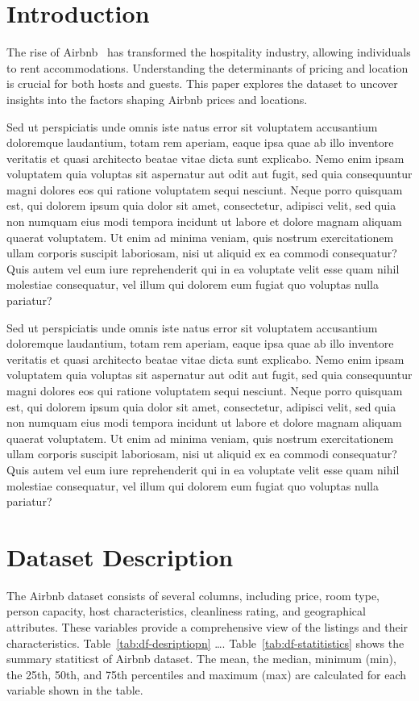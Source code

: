 \documentclass[10pt, conference, compsocconf]{IEEEtran}
\begin{document}
\section{Introduction}
The rise of Airbnb~\cite{andreu2020airbnb} has transformed the hospitality industry, allowing individuals to rent accommodations. 
Understanding the determinants of pricing and location is crucial for both hosts and guests. 
This paper explores the dataset to uncover insights into the factors shaping Airbnb prices and locations.

Sed ut perspiciatis unde omnis iste natus error sit voluptatem accusantium doloremque laudantium, totam rem aperiam, eaque ipsa quae ab illo inventore veritatis et quasi architecto beatae vitae dicta sunt explicabo. 
Nemo enim ipsam voluptatem quia voluptas sit aspernatur aut odit aut fugit, sed quia consequuntur magni dolores eos qui ratione voluptatem sequi nesciunt. Neque porro quisquam est, qui dolorem ipsum quia dolor sit amet, consectetur, adipisci velit, sed quia non numquam eius modi tempora incidunt ut labore et dolore magnam aliquam quaerat voluptatem. 
Ut enim ad minima veniam, quis nostrum exercitationem ullam corporis suscipit laboriosam, nisi ut aliquid ex ea commodi consequatur? Quis autem vel eum iure reprehenderit qui in ea voluptate velit esse quam nihil molestiae consequatur, vel illum qui dolorem eum fugiat quo voluptas nulla pariatur?

Sed ut perspiciatis unde omnis iste natus error sit voluptatem accusantium doloremque laudantium, totam rem aperiam, eaque ipsa quae ab illo inventore veritatis et quasi architecto beatae vitae dicta sunt explicabo. 
Nemo enim ipsam voluptatem quia voluptas sit aspernatur aut odit aut fugit, sed quia consequuntur magni dolores eos qui ratione voluptatem sequi nesciunt. Neque porro quisquam est, qui dolorem ipsum quia dolor sit amet, consectetur, adipisci velit, sed quia non numquam eius modi tempora incidunt ut labore et dolore magnam aliquam quaerat voluptatem. 
Ut enim ad minima veniam, quis nostrum exercitationem ullam corporis suscipit laboriosam, nisi ut aliquid ex ea commodi consequatur? Quis autem vel eum iure reprehenderit qui in ea voluptate velit esse quam nihil molestiae consequatur, vel illum qui dolorem eum fugiat quo voluptas nulla pariatur?

\section{Dataset Description}
The Airbnb dataset consists of several columns, including price, room type, person capacity, host characteristics, cleanliness rating, and geographical attributes. 
These variables provide a comprehensive view of the listings and their characteristics.
Table~\ref{tab:df-desriptiopn} \dots.
Table~\ref{tab:df-statitistics} shows the summary statiticst of Airbnb dataset. 
The mean, the median, minimum (min), the 25th, 50th, and 75th percentiles and maximum (max) are calculated for each variable shown in the table.
\end{document}
